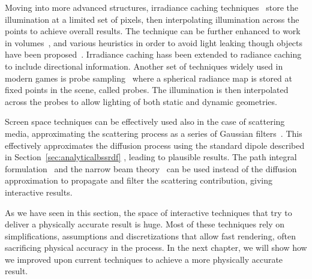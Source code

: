Moving into more advanced structures, irradiance caching techniques~\cite{Ward1988, Tole2002} store the illumination at a limited set of pixels, then interpolating illumination across the points to achieve overall results. The technique can be further enhanced to work in volumes~\cite{Greger1998}, and various heuristics in order to avoid light leaking though objects have been proposed~\cite{Gautron2009}. Irradiance caching hass been extended to radiance caching to include directional information. Another set of techniques widely used in modern games is probe sampling~\cite{Levoy1996,Hooker2016, McGuire2017,Silvennoinen2017} where a spherical radiance map is stored at fixed points in the scene, called probes. The illumination is then interpolated across the probes to allow lighting of both static and dynamic geometries. 

Screen space techniques can be effectively used also in the case of scattering media, approximating the scattering process as a series of Gaussian filters~\cite{Jimenez2015}. This effectively approximates the diffusion process using the standard dipole described in Section~\ref{sec:analyticalbssrdf} \cite{Jensen2001}, leading to plausible results. The path integral formulation~\cite{Premoze2003, Hegeman2005} and the narrow beam theory~\cite{Shinya2016} can be used instead of the diffusion approximation to propagate and filter the scattering contribution, giving interactive results.

As we have seen in this section, the space of interactive techniques that try to deliver a physically accurate result is huge. Most of these techniques rely on simplifications, assumptions and discretizations that allow fast rendering, often sacrificing physical accuracy in the process. In the next chapter, we will show how we improved upon current techniques to achieve a more physically accurate result.
